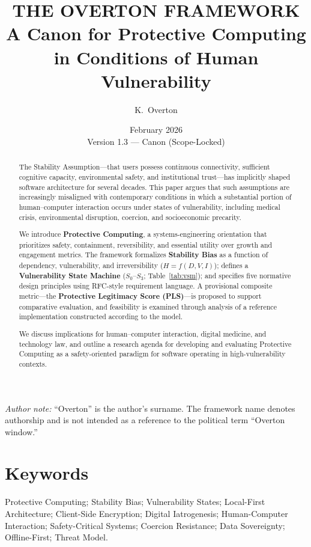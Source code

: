 \documentclass[12pt]{article}
\title{\textbf{THE OVERTON FRAMEWORK}\\[0.5em]
A Canon for Protective Computing in Conditions of Human Vulnerability}
\author{K.~Overton}
\date{February 2026 \\[0.25em] Version 1.3 --- Canon (Scope-Locked)}
\begin{document}
\maketitle

\noindent\textit{Author note:} ``Overton'' is the author's surname. The framework name denotes authorship and is not intended as a reference to the political term ``Overton window.''

\begin{abstract}
The Stability Assumption---that users possess continuous connectivity, sufficient cognitive capacity, environmental safety, and institutional trust---has implicitly shaped software architecture for several decades. This paper argues that such assumptions are increasingly misaligned with contemporary conditions in which a substantial portion of human--computer interaction occurs under states of vulnerability, including medical crisis, environmental disruption, coercion, and socioeconomic precarity.

We introduce \textbf{Protective Computing}, a systems-engineering orientation that prioritizes safety, containment, reversibility, and essential utility over growth and engagement metrics. The framework formalizes \textbf{Stability Bias} as a function of dependency, vulnerability, and irreversibility ($H = f(D, V, I)$); defines a \textbf{Vulnerability State Machine} ($S_0$--$S_3$; Table~\ref{tab:vsm}); and specifies five normative design principles using RFC-style requirement language. A provisional composite metric---the \textbf{Protective Legitimacy Score (PLS)}---is proposed to support comparative evaluation, and feasibility is examined through analysis of a reference implementation constructed according to the model.

We discuss implications for human--computer interaction, digital medicine, and technology law, and outline a research agenda for developing and evaluating Protective Computing as a safety-oriented paradigm for software operating in high-vulnerability contexts.
\end{abstract}

\section*{Keywords}
Protective Computing; Stability Bias; Vulnerability States; Local-First Architecture; Client-Side Encryption; Digital Iatrogenesis; Human-Computer Interaction; Safety-Critical Systems; Coercion Resistance; Data Sovereignty; Offline-First; Threat Model.
\end{document}
